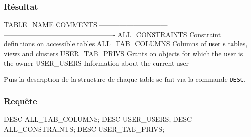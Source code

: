 \documentclass[•]{article}
\begin{document}
\subsubsection{Résultat}
\begin{sql}
TABLE_NAME		       COMMENTS
------------------------------ -------------------------------------------------
ALL_CONSTRAINTS 	       Constraint definitions on accessible tables
ALL_TAB_COLUMNS 	       Columns of user s tables, views and clusters
USER_TAB_PRIVS		       Grants on objects for which the user is the owner
USER_USERS		       	   Information about the current user
\end{sql}

Puis la description de la structure de chaque table se fait via la commande \texttt{DESC}.
\subsubsection{Requête}
\begin{sql}
DESC ALL_TAB_COLUMNS;
DESC USER_USERS;
DESC ALL_CONSTRAINTS;
DESC USER_TAB_PRIVS;
\end{sql}
\end{document}
